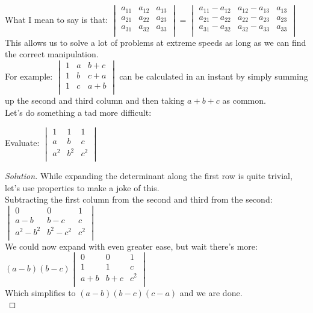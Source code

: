 What I mean to say is that: $\begin{vmatrix}
    a_{11} & a_{12} & a_{13} \\
    a_{21} & a_{22} & a_{23} \\
    a_{31} & a_{32} & a_{33} \\
\end{vmatrix} = \begin{vmatrix}
    a_{11}-a_{12} & a_{12}-a_{13} & a_{13} \\
    a_{21}-a_{22} & a_{22}-a_{23} & a_{23} \\
    a_{31}-a_{32} & a_{32}-a_{33} & a_{33} \\
\end{vmatrix}$
This allows us to solve a lot of problems at extreme speeds as long as we can find the correct manipulation.\\
For example: $\begin{vmatrix}
    1 & a & b+c \\
    1 & b & c+a \\
    1 & c & a+b \\
\end{vmatrix}$ can be calculated in an instant by simply summing up the second and third column and then taking $a+b+c$ as common.\\
Let's do something a tad more difficult:\\
\begin{example}
    Evaluate: $\begin{vmatrix}
    1 & 1 & 1 \\
    a & b & c \\
    a^2 & b^2 & c^2 \\
\end{vmatrix}$
\end{example}
\begin{proof}
    [Solution]
    While expanding the determinant along the first row is quite trivial, let's use properties to make a joke of this.\\
    Subtracting the first column from the second and third from the second:\\
    $\begin{vmatrix}
    0 & 0 & 1 \\
    a-b & b-c & c \\
    a^2-b^2 & b^2-c^2 & c^2 \\
\end{vmatrix}$\\
We could now expand with even greater ease, but wait there's more:\\
$(a-b)(b-c)\begin{vmatrix}
    0 & 0 & 1 \\
    1 & 1 & c \\
    a+b & b+c & c^2 \\
\end{vmatrix}$\\
Which simplifies to $(a-b)(b-c)(c-a)$ and we are done.\\
\end{proof}
